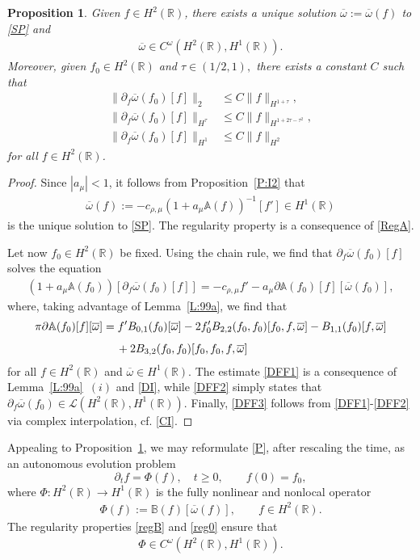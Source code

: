 \documentclass[11pt,reqno]{amsart}
\numberwithin{equation}{section}
\newcommand{\0}{\Omega}
\newcommand{\p}{\partial}
\newcommand{\ov}{\overline}
\newcommand{\oo}{\ov\omega}
\newcommand{\bA}{\mathbb{A}}
\newcommand{\bB}{\mathbb{B}}
\newcommand{\kL}{\mathcal{L}}
\newcommand{\R}{\mathbb{R}}
\newtheorem{prop}[thm]{Proposition}
\numberwithin{equation}{section}
\begin{document}
 



\begin{prop}\label{P:88a} Given $f\in H^2(\R)$,  there exists a unique solution $\oo:=\oo(f)$ to  \eqref{SP} and
\begin{align}\label{reg0}
 \oo\in C^\omega(H^2(\R), H^1(\R)).
\end{align}
Moreover,  given $f_0\in H^2(\R)$ and $\tau\in(1/2,1),$ there exists a constant $C $ such that
\begin{align}
  \|\p_f\oo(f_0)[f]\|_2&\leq C\|f\|_{H^{1+\tau}},\label{DFF1}\\[1ex]
 \|\p_f\oo(f_0)[f]\|_{H^\tau}&\leq C\|f\|_{H^{1+2\tau-\tau^2}},\label{DFF3}\\[1ex]
    \|\p_f\oo(f_0)[f]\|_{H^1 }&\leq C\|f\|_{H^2}\label{DFF2}
\end{align}
for all $f\in H^2(\R)$.
\end{prop}
\begin{proof} Since $|a_\mu|<1$, it follows from Proposition~\ref{P:I2} that 
\begin{align*}
 \oo(f):= -c_{\rho,\mu}(1+a_\mu\bA(f))^{-1}[f']\in H^1(\R)
\end{align*}
is the unique solution to \eqref{SP}.
The regularity property is a consequence of \eqref{RegA}.

Let now $f_0\in H^2(\R)$ be fixed. Using the chain rule, we find that   $\p_f\oo(f_0)[f]$ solves the equation
\begin{align}\label{FD2}
 (1+a_\mu \bA(f_0))[\p_f\oo(f_0)[f]]=-c_{\rho,\mu}f'-a_\mu\p\bA(f_0)[f][\oo(f_0)],
\end{align}
where, taking advantage of Lemma~\ref{L:99a}, we find that
\begin{align}
  \pi\p\bA(f_0)[f][\oo]&=f'B_{0,1}(f_0)[\oo]-2f_0'B_{2,2}(f_0,f_0)[f_0,f,\oo]-B_{1,1}(f_0)[f,\oo]\nonumber\\[1ex]
  &\hspace{0.424cm}+2B_{3,2}(f_0,f_0)[f_0,f_0,f,\oo]\label{FD3}
\end{align}
for all $f\in H^2(\R)$ and $\oo\in H^1(\R) $.
The estimate \eqref{DFF1} is a consequence of Lemma~\ref{L:99a}~$(i)$ and \eqref{DI}, while \eqref{DFF2}  simply states that $\p_f\oo(f_0)\in\kL(H^2(\R), H^1(\R))$.
 Finally, \eqref{DFF3} follows from \eqref{DFF1}-\eqref{DFF2} via complex interpolation, cf. \eqref{CI}.  
\end{proof}



Appealing to Proposition~\ref{P:88a}, we may reformulate \eqref{P}, after rescaling the time,  as an autonomous evolution problem  
\begin{equation}\label{Pest2}
  \p_t f= \Phi(f),\quad t\geq 0,\qquad f(0)=f_0,
\end{equation}
where $\Phi:H^2(\R)\to H^1(\R)$ is the fully nonlinear and nonlocal operator
\begin{align*}
 \Phi(f):=\bB(f)[\oo(f)],\qquad f\in H^2(\R).
\end{align*}
The regularity properties  \eqref{regB} and \eqref{reg0} ensure that  
\begin{align}\label{reg22}
  \Phi\in C^{\omega}  (H^2(\R), H^1(\R)).
\end{align} 
\end{document}
